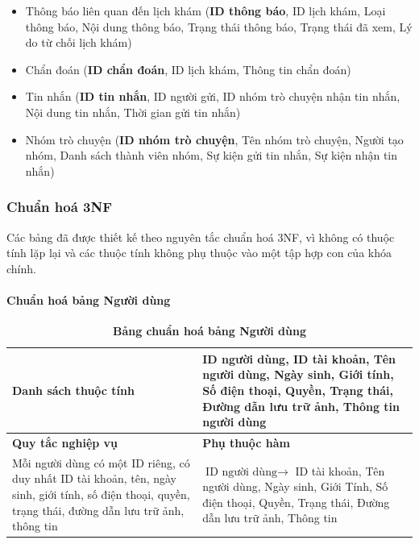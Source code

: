 \begin{itemize}
	\item Thông báo liên quan đến lịch khám (\textbf{ID thông báo}, ID lịch khám, Loại thông báo, Nội dung thông báo, Trạng thái thông báo, Trạng thái đã xem, Lý do từ chối lịch khám)
	\item Chẩn đoán (\textbf{ID chẩn đoán}, ID lịch khám, Thông tin chẩn đoán)
	\item Tin nhắn (\textbf{ID tin nhắn}, ID người gửi, ID nhóm trò chuyện nhận tin nhắn, Nội dung tin nhắn, Thời gian gửi tin nhắn)
	\item Nhóm trò chuyện (\textbf{ID nhóm trò chuyện}, Tên nhóm trò chuyện, Người tạo nhóm, Danh sách thành viên nhóm, Sự kiện gửi tin nhắn, Sự kiện nhận tin nhắn)

\end{itemize}

\subsubsection{Chuẩn hoá 3NF}
Các bảng đã được thiết kế theo nguyên tắc chuẩn hoá 3NF, vì không có thuộc tính lặp lại và các thuộc tính không phụ thuộc vào một tập hợp con của khóa chính.

\paragraph{Chuẩn hoá bảng Người dùng}
\mbox{}
\begin{table}[H]
	\caption{\bfseries \fontsize{12pt}{0pt}\selectfont Bảng chuẩn hoá bảng Người dùng}
	\centering
	\begin{tabularx}{0.9\textwidth}{|X|X|}
		\hline
		\textbf{Danh sách thuộc tính}                & ID người dùng, ID tài khoản, Tên người dùng, Ngày sinh, Giới tính, Số điện thoại, Quyền, Trạng thái, Đường dẫn lưu trữ ảnh, Thông tin người dùng                                  \\
		\hline
		\textbf{Quy tắc nghiệp vụ}                   & \textbf{Phụ thuộc hàm}                                                                                                                                                            \\
		\hline
		Mỗi người dùng có một ID riêng, có duy nhất ID tài khoản, tên, ngày sinh, giới tính, số điện thoại, quyền,
		trạng thái, đường dẫn lưu trữ ảnh, thông tin & \parbox[t]{\linewidth}{$\text{ID người dùng} \rightarrow$ ID tài khoản, Tên người dùng, Ngày sinh, Giới Tính, Số điện thoại, Quyền, Trạng thái, Đường dẫn lưu trữ ảnh, Thông tin} \\
		\hline
		                                                                                                                                                    \\
		                                                                                                                                                              \\
		\hline
	\end{tabularx}
\end{table}

